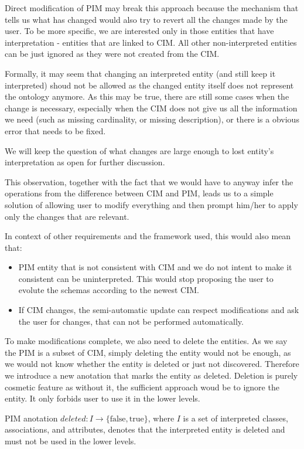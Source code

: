 Direct modification of PIM may break this approach because the mechanism that tells us what has changed would also try to revert all the changes made by the user. To be more specific, we are interested only in those entities that have interpretation - entities that are linked to CIM. All other non-interpreted entities can be just ignored as they were not created from the CIM.

Formally, it may seem that changing an interpreted entity (and still keep it interpreted) shoud not be allowed as the changed entity itself does not represent the ontology anymore. As this may be true, there are still some cases when the change is necessary, especially when the CIM does not give us all the information we need (such as missing cardinality, or missing description), or there is a obvious error that needs to be fixed.

We will keep the question of what changes are large enough to lost entity's interpretation as open for further discussion.

This observation, together with the fact that we would have to anyway infer the operations from the difference between CIM and PIM, leads us to a simple solution of allowing user to modify everything and then prompt him/her to apply only the changes that are relevant.

In context of other requirements and the framework used, this would also mean that:
\begin{itemize}
    \item PIM entity that is not consistent with CIM and we do not intent to make it consistent can be uninterpreted. This would stop proposing the user to evolute the schemas according to the newest CIM.
    \item If CIM changes, the semi-automatic update can respect modifications and ask the user for changes, that can not be performed automatically.
\end{itemize}

To make modifications complete, we also need to delete the entities. As we say the PIM is a subset of CIM, simply deleting the entity would not be enough, as we would not know whether the entity is deleted or just not discovered. Therefore we introduce a new anotation that marks the entity as deleted. Deletion is purely cosmetic feature as without it, the sufficient approach woud be to ignore the entity. It only forbids user to use it in the lower levels.

\begin{definition}[deleted]
    PIM anotation $deleted: I \rightarrow \{\textrm{false}, \textrm{true}\}$, where $I$ is a set of interpreted classes, associations, and attributes, denotes that the interpreted entity is deleted and must not be used in the lower levels.
\end{definition}

